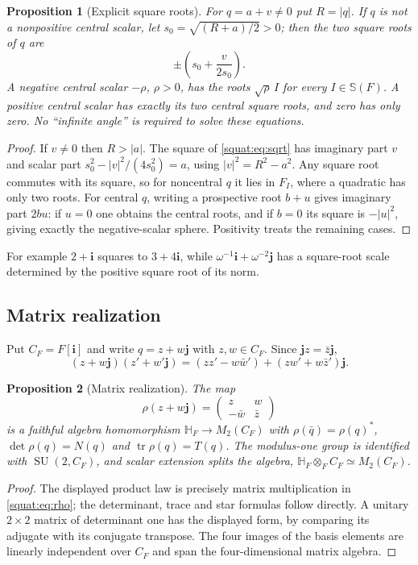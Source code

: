 \documentclass[11pt,letterpaper]{article}
\numberwithin{equation}{section}
\newtheorem{proposition}[proposition]{Proposition}
\theoremstyle{definition}
\theoremstyle{remark}
\newcommand{\HF}{\mathbb H_F}
\newcommand{\ii}{\mathbf i}
\newcommand{\jj}{\mathbf j}
\newcommand{\tr}{\operatorname{tr}}
\newcommand{\SU}{\operatorname{SU}}
\newcommand{\abs}[1]{\left|#1\right|}
\begin{document}
\begin{proposition}[Explicit square roots]\label{squat:prop:sqrt}
For $q=a+v\ne0$ put $R=\abs q$. If $q$ is not a nonpositive central scalar, let
$s_0=\sqrt{(R+a)/2}>0$; then the two square roots of $q$ are
\begin{equation}\label{squat:eq:sqrt}
 \pm\left(s_0+\frac{v}{2s_0}\right).
\end{equation}
A negative central scalar $-\rho$, $\rho>0$, has the roots $\sqrt\rho\,I$ for every
$I\in\mathbb S(F)$. A positive central scalar has exactly its two central square roots,
and zero has only zero. No ``infinite angle'' is required to solve these equations.
\end{proposition}
\begin{proof}
If $v\ne0$ then $R>\abs a$. The square of \cref{squat:eq:sqrt} has imaginary part $v$
and scalar part $s_0^2-\abs v^2/(4s_0^2)=a$, using $\abs v^2=R^2-a^2$. Any square root
commutes with its square, so for noncentral $q$ it lies in $F_I$, where a quadratic has
only two roots. For central $q$, writing a prospective root $b+u$ gives imaginary part
$2bu$: if $u=0$ one obtains the central roots, and if $b=0$ its square is $-\abs u^2$,
giving exactly the negative-scalar sphere. Positivity treats the remaining cases.
\end{proof}

For example $2+\ii$ squares to $3+4\ii$, while $\omega^{-1}\ii+\omega^{-2}\jj$ has a
square-root scale determined by the positive square root of its norm.

\subsection{Matrix realization}\label{squat:sub:matrix}
Put $C_F=F[\ii]$ and write $q=z+w\jj$ with $z,w\in C_F$. Since $\jj z=\bar z\jj$,
\[
 (z+w\jj)(z'+w'\jj)=(zz'-w\bar w')+(zw'+w\bar z')\jj .
\]

\begin{proposition}[Matrix realization]\label{squat:prop:matrix}
The map
\begin{equation}\label{squat:eq:rho}
 \rho(z+w\jj)=\begin{pmatrix}z&w\\-\bar w&\bar z\end{pmatrix}
\end{equation}
is a faithful algebra homomorphism $\HF\to M_2(C_F)$ with
$\rho(\bar q)=\rho(q)^*$, $\det\rho(q)=N(q)$ and $\tr\rho(q)=T(q)$. The modulus-one
group is identified with $\SU(2,C_F)$, and scalar extension splits the algebra,
$\HF\otimes_FC_F\simeq M_2(C_F)$.
\end{proposition}
\begin{proof}
The displayed product law is precisely matrix multiplication in
\cref{squat:eq:rho}; the determinant, trace and star formulas follow directly. A unitary
$2\times2$ matrix of determinant one has the displayed form, by comparing its adjugate
with its conjugate transpose. The four images of the basis elements are linearly
independent over $C_F$ and span the four-dimensional matrix algebra.
\end{proof}
\end{document}
